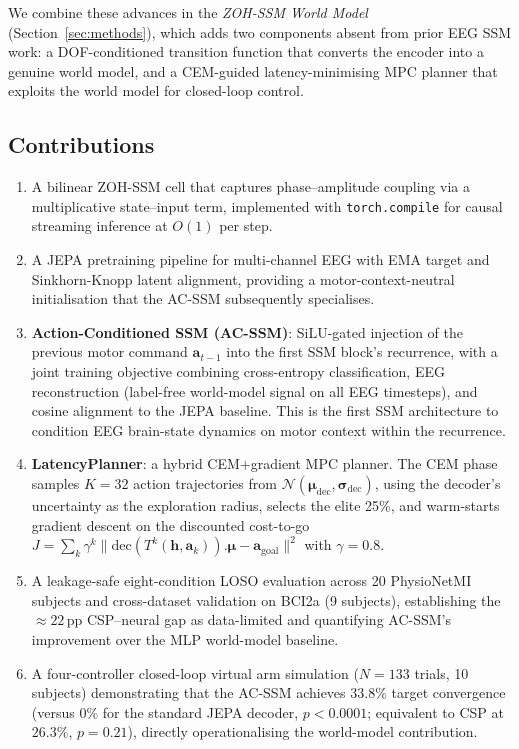 \documentclass[journal]{IEEEtran}
\begin{document}
We combine these advances in the \emph{ZOH-SSM World Model} (Section~\ref{sec:methods}), which adds two components absent from prior EEG SSM work: a DOF-conditioned transition function that converts the encoder into a genuine world model, and a CEM-guided latency-minimising MPC planner that exploits the world model for closed-loop control.

\subsection*{Contributions}
\begin{enumerate}
  \item A bilinear ZOH-SSM cell that captures phase--amplitude coupling via a multiplicative state--input term, implemented with \texttt{torch.compile} for causal streaming inference at $O(1)$ per step.
  \item A JEPA pretraining pipeline for multi-channel EEG with EMA target and Sinkhorn-Knopp latent alignment, providing a motor-context-neutral initialisation that the AC-SSM subsequently specialises.
  \item \textbf{Action-Conditioned SSM (AC-SSM)}: SiLU-gated injection of the previous motor command $\mathbf{a}_{t-1}$ into the first SSM block's recurrence, with a joint training objective combining cross-entropy classification, EEG reconstruction (label-free world-model signal on all EEG timesteps), and cosine alignment to the JEPA baseline. This is the first SSM architecture to condition EEG brain-state dynamics on motor context within the recurrence.
  \item \textbf{LatencyPlanner}: a hybrid CEM+gradient MPC planner. The CEM phase samples $K=32$ action trajectories from $\mathcal{N}(\bm\mu_\text{dec}, \bm\sigma_\text{dec})$, using the decoder's uncertainty as the exploration radius, selects the elite 25\%, and warm-starts gradient descent on the discounted cost-to-go $J = \sum_k \gamma^k \|\text{dec}(T^k(\mathbf{h}, \mathbf{a}_k)).\bm\mu - \mathbf{a}_\text{goal}\|^2$ with $\gamma=0.8$.
  \item A leakage-safe eight-condition LOSO evaluation across 20 PhysioNetMI subjects and cross-dataset validation on BCI2a (9 subjects), establishing the $\approx\!22$\,pp CSP--neural gap as data-limited and quantifying AC-SSM's improvement over the MLP world-model baseline.
  \item A four-controller closed-loop virtual arm simulation ($N=133$ trials, 10 subjects) demonstrating that the AC-SSM achieves $33.8\%$ target convergence (versus $0\%$ for the standard JEPA decoder, $p{<}0.0001$; equivalent to CSP at $26.3\%$, $p=0.21$), directly operationalising the world-model contribution.
\end{enumerate}
\vspace*{-0.5\baselineskip}
\end{document}
